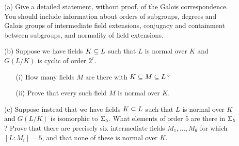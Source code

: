 \documentclass[a4paper]{article}
\begin{document}
\begin{problem}%
 \begin{itemize}
  \item[(a)] Give a detailed statement, without proof, of the Galois
   correspondence.  You should include information about orders of
   subgroups, degrees and Galois groups of intermediate field
   extensions, conjugacy and containment between subgroups, and
   normality of field extensions.  
  \item[(b)] Suppose we have fields $K\subseteq L$ such that $L$ is normal
   over $K$ and $G(L/K)$ is cyclic of order $2^r$.  
   \begin{itemize}
    \item[(i)] How many fields $M$ are there with $K\subseteq M\subseteq L$?
    \item[(ii)] Prove that every such field $M$ is normal over
     $K$.  
   \end{itemize}
  \item[(c)] Suppose instead that we have fields $K\subseteq L$ such that
   $L$ is normal over $K$ and $G(L/K)$ is isomorphic to $\Sigma_5$.  What
   elements of order $5$ are there in $\Sigma_5$?  Prove that there are
   precisely six intermediate fields $M_1,\dotsc,M_6$ for which
   $[L:M_i]=5$, and that none of these is normal over $K$. 
 \end{itemize}
\end{problem}
\end{document}
